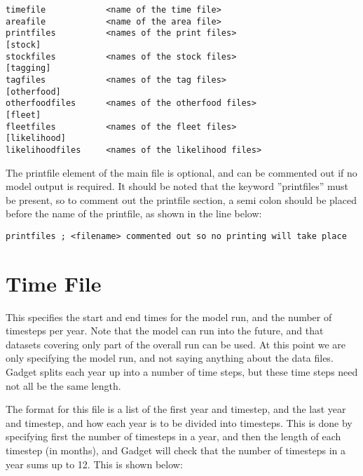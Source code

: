 \documentclass [a4paper, 10pt]{book}
\begin{document}
{\small\begin{verbatim}
timefile            <name of the time file>
areafile            <name of the area file>
printfiles          <names of the print files>
[stock]
stockfiles          <names of the stock files>
[tagging]
tagfiles            <names of the tag files>
[otherfood]
otherfoodfiles      <names of the otherfood files>
[fleet]
fleetfiles          <names of the fleet files>
[likelihood]
likelihoodfiles     <names of the likelihood files>
\end{verbatim}}


The printfile element of the main file is optional, and can be commented out if no model output is required.  It should be noted that the keyword ''printfiles'' must be present, so to comment out the printfile section, a semi colon should be placed before the name of the printfile, as shown in the line below:

{\small\begin{verbatim}
printfiles ; <filename> commented out so no printing will take place
\end{verbatim}}

\section{Time File}\label{sec:timefile}
This specifies the start and end times for the model run, and the number of timesteps per year. Note that the model can run into the future, and that datasets covering only part of the overall run can be used.  At this point we are only specifying the model run, and not saying anything about the data files.  Gadget splits each year up into a number of time steps, but these time steps need not all be the same length.

\bigskip
The format for this file is a list of the first year and timestep, and the last year and timestep, and how each year is to be divided into timesteps.  This is done by specifying first the number of timesteps in a year, and then the length of each timestep (in months), and Gadget will check that the number of timesteps in a year sums up to 12.  This is shown below:
\end{document}
